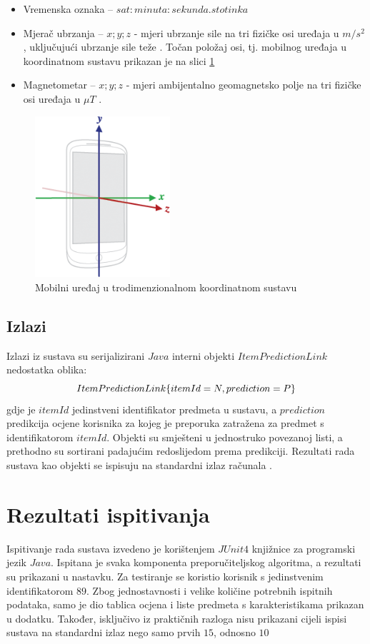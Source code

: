 \documentclass[times, utf8, diplomski, numeric]{fer}
\begin{document}
\begin{itemize}
  \item Vremenska oznaka -- $sat:minuta:sekunda.stotinka$
  \item Mjerač ubrzanja -- $x;y;z$ - mjeri ubrzanje sile na tri fizičke osi
  uređaja u $m/s^2$, uključujući ubrzanje sile teže \cite{AndroidSensors}. Točan
  položaj osi, tj. mobilnog uređaja u koordinatnom sustavu prikazan je na slici
  \ref{fig:coordinates}
  \item Magnetometar -- $x;y;z$ - mjeri ambijentalno geomagnetsko polje na tri
  fizičke osi uređaja u $\mu T$ \cite{AndroidSensors}.
\end{itemize}

\begin{figure}[!htb]
	\centering
	\includegraphics[width=5cm]{images/coordinates.png}
	\caption{Mobilni uređaj u trodimenzionalnom koordinatnom sustavu}
	\label{fig:coordinates}
\end{figure}

\subsection{Izlazi}

Izlazi iz sustava su serijalizirani $Java$ interni objekti $ItemPredictionLink$
nedostatka oblika:
\begin{equation}
	\centering
	ItemPredictionLink\{ 
		itemId=N,
		prediction=P
	\}
\end{equation}
gdje je $itemId$ jedinstveni identifikator predmeta u sustavu, a $prediction$
predikcija ocjene korisnika za kojeg je preporuka zatražena za predmet s
identifikatorom $itemId$. Objekti su smješteni u jednostruko povezanoj listi, a
prethodno su sortirani padajućim redoslijedom prema predikciji. Rezultati rada
sustava kao objekti se ispisuju na standardni izlaz računala .

\section{Rezultati ispitivanja}
Ispitivanje rada sustava izvedeno je korištenjem $JUnit 4$ knjižnice za
programski jezik $Java$. Ispitana je svaka komponenta preporučiteljskog
algoritma, a rezultati su prikazani u nastavku.  Za testiranje se koristio
korisnik s jedinstvenim identifikatorom $89$.
Zbog jednostavnosti i velike količine potrebnih ispitnih podataka, samo je dio
tablica ocjena i liste predmeta s karakteristikama prikazan u dodatku. Također,
isključivo iz praktičnih razloga nisu prikazani cijeli ispisi sustava na
standardni izlaz nego samo prvih $15$, odnosno $10$
\end{document}
